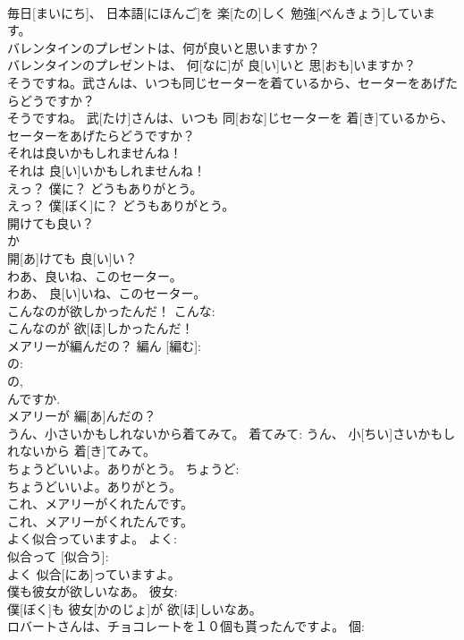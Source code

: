 \documentclass[8pt]{extreport}
\begin{document}
\begin{CJK}{UTF8}{min}
\\	毎日[まいにち]、 日本語[にほんご]を 楽[たの]しく 勉強[べんきょう]しています。	
\\	バレンタインのプレゼントは、何が良いと思いますか？	
\\	バレンタインのプレゼントは、 何[なに]が 良[い]いと 思[おも]いますか？	
\\	そうですね。武さんは、いつも同じセーターを着ているから、セーターをあげたらどうですか？	
\\	そうですね。 武[たけ]さんは、いつも 同[おな]じセーターを 着[き]ているから、セーターをあげたらどうですか？	
\\	それは良いかもしれませんね！	
\\	それは 良[い]いかもしれませんね！	
\\	えっ？ 僕に？ どうもありがとう。	
\\	えっ？ 僕[ぼく]に？ どうもありがとう。	
\\	開けても良い？	
\\	か 
\\	開[あ]けても 良[い]い？	
\\	わあ、良いね、このセーター。	
\\	わあ、 良[い]いね、このセーター。	
\\	こんなのが欲しかったんだ！	こんな: 
\\	こんなのが 欲[ほ]しかったんだ！	
\\	メアリーが編んだの？	編ん [編む]: 
\\	の: 
\\	の, 
\\	んですか. 
\\	メアリーが 編[あ]んだの？	
\\	うん、小さいかもしれないから着てみて。	着てみて:	うん、 小[ちい]さいかもしれないから 着[き]てみて。	
\\	ちょうどいいよ。ありがとう。	ちょうど: 
\\	ちょうどいいよ。ありがとう。	
\\	これ、メアリーがくれたんです。	
\\	これ、メアリーがくれたんです。	
\\	よく似合っていますよ。	よく: 
\\	似合って [似合う]: 
\\	よく 似合[にあ]っていますよ。	
\\	僕も彼女が欲しいなあ。	彼女: 
\\	僕[ぼく]も 彼女[かのじょ]が 欲[ほ]しいなあ。	
\\	ロバートさんは、チョコレートを１０個も貰ったんですよ。	個: 

\end{CJK}
\end{document}
